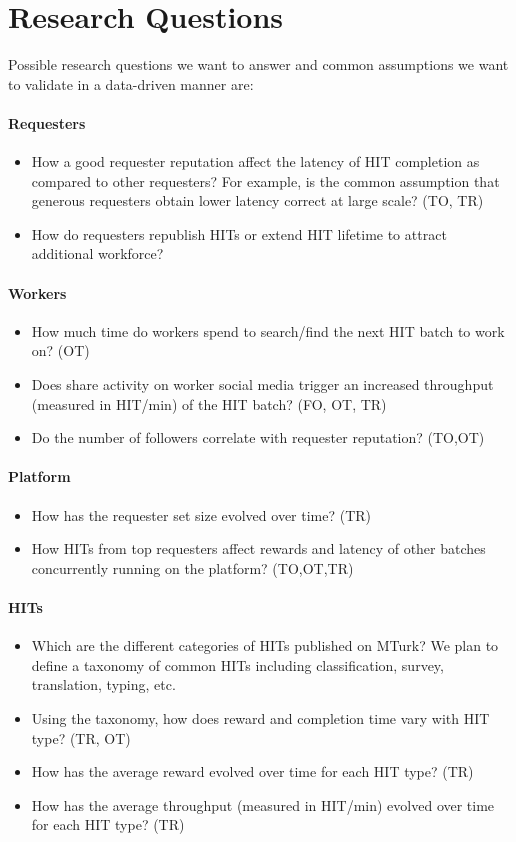 \documentclass{sig-alternate}
\begin{document}
\section{Research Questions}

Possible research questions we want to answer and common assumptions we want to validate in a data-driven manner are:
\paragraph{Requesters}
\begin{itemize}
	\item How a good requester reputation affect the latency of HIT completion as compared to other requesters? For example, is the common assumption that generous requesters obtain lower latency correct at large scale? (TO, TR)
	\item How do requesters republish HITs or extend HIT lifetime to attract additional workforce?
\end{itemize}


\paragraph{Workers}
\begin{itemize}
	\item How much time do workers spend to search/find the next HIT batch to work on? (OT)
	\item Does share activity on worker social media trigger an increased throughput (measured in HIT/min) of the HIT batch? (FO, OT, TR)
	\item Do the number of followers correlate with requester reputation? (TO,OT)
\end{itemize}


\paragraph{Platform}
\begin{itemize}
	\item How has the requester set size evolved over time? (TR)
	\item How HITs from top requesters affect rewards and latency of other batches concurrently running on the platform? (TO,OT,TR)
\end{itemize}

\paragraph{HITs}
\begin{itemize}
	\item Which are the different categories of HITs published on MTurk? We plan to define a taxonomy of common HITs including classification, survey, translation, typing, etc.
	\item Using the taxonomy, how does reward and completion time vary with HIT type? (TR, OT)
	\item How has the average reward evolved over time for each HIT type? (TR)
	\item How has the average throughput (measured in HIT/min) evolved over time for each HIT type? (TR)
\end{itemize}
\end{document}
